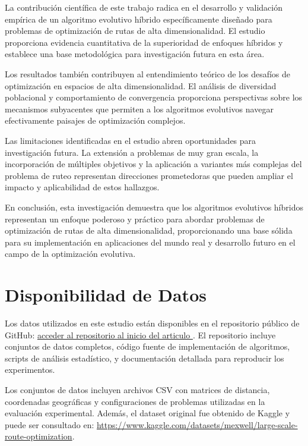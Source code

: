 \documentclass[10pt,a4paper]{article}
\begin{document}
\begin{multicols}{2}
La contribución científica de este trabajo radica en el desarrollo y validación empírica de un algoritmo evolutivo híbrido específicamente diseñado para problemas de optimización de rutas de alta dimensionalidad. El estudio proporciona evidencia cuantitativa de la superioridad de enfoques híbridos y establece una base metodológica para investigación futura en esta área.

Los resultados también contribuyen al entendimiento teórico de los desafíos de optimización en espacios de alta dimensionalidad. El análisis de diversidad poblacional y comportamiento de convergencia proporciona perspectivas sobre los mecanismos subyacentes que permiten a los algoritmos evolutivos navegar efectivamente paisajes de optimización complejos.

Las limitaciones identificadas en el estudio abren oportunidades para investigación futura. La extensión a problemas de muy gran escala, la incorporación de múltiples objetivos y la aplicación a variantes más complejas del problema de ruteo representan direcciones prometedoras que pueden ampliar el impacto y aplicabilidad de estos hallazgos.

En conclusión, esta investigación demuestra que los algoritmos evolutivos híbridos representan un enfoque poderoso y práctico para abordar problemas de optimización de rutas de alta dimensionalidad, proporcionando una base sólida para su implementación en aplicaciones del mundo real y desarrollo futuro en el campo de la optimización evolutiva.



\section{Disponibilidad de Datos}

Los datos utilizados en este estudio están disponibles en el repositorio público de GitHub: \href{https://github.com/YonhelMamaniCruz/M_optimizacion/tree/main/actividad3_unidad2}{acceder al repositorio al inicio del articulo }. El repositorio incluye conjuntos de datos completos, código fuente de implementación de algoritmos, scripts de análisis estadístico, y documentación detallada para reproducir los experimentos.

Los conjuntos de datos incluyen archivos CSV con matrices de distancia, coordenadas geográficas y configuraciones de problemas utilizadas en la evaluación experimental. Además, el dataset original fue obtenido de Kaggle y puede ser consultado en: \href{https://www.kaggle.com/datasets/mexwell/large-scale-route-optimization}{https://www.kaggle.com/datasets/mexwell/large-scale-route-optimization}. 


\end{multicols}
\end{document}
